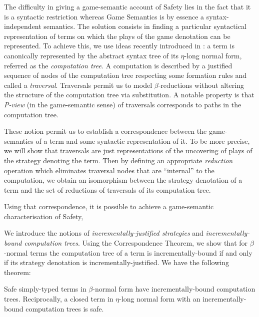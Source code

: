 \documentclass{llncs}
\begin{document}
The difficulty in giving a game-semantic account of Safety lies in
the fact that it is a syntactic restriction whereas Game Semantics
is by essence a syntax-independent semantics. The solution consists
in finding a particular syntactical representation of terms on which
the plays of the game denotation can be represented.
To achieve this, we use ideas recently introduced in \cite{OngLics2006}: a term
is canonically represented by the abstract syntax tree of its
$\eta$-long normal form, referred as the \emph{computation tree}. A
computation is described by a justified sequence of nodes of the
computation tree respecting some formation rules and called a
\emph{traversal}. Traversals permit us to model $\beta$-reductions
without altering the structure of the computation tree via
substitution. A notable property is that \emph{P-view} (in the game-semantic sense) of traversals
corresponds to paths in the computation tree.

These notion permit us to establish a correspondence between the game-semantics of a term and 
some syntactic representation of it. 
To be more precise, we will show that traversals are just representations of the
uncovering of plays of the strategy denoting the term.
Then by defining an appropriate \emph{reduction} operation which eliminates traversal
nodes that are ``internal'' to the computation, we obtain an
isomorphism between the strategy denotation of a term and the set of
reductions of traversals of its computation tree.


Using that correspondence, it is possible to achieve a game-semantic characterisation
of Safety,

We introduce the notions of \emph{incrementally-justified
strategies} and \emph{incrementally-bound computation trees}. Using
the Correspondence Theorem, we show that for $\beta$-normal terms
the computation tree of a term is incrementally-bound if and only if
its strategy denotation is incrementally-justified. We have the
following theorem:

\begin{thm}
\label{thm:gamesem_charact} Safe simply-typed terms in
$\beta$-normal form have incrementally-bound computation trees.
Reciprocally, a closed term in $\eta$-long normal form with an
incrementally-bound computation trees is safe.
\end{thm}
\end{document}
